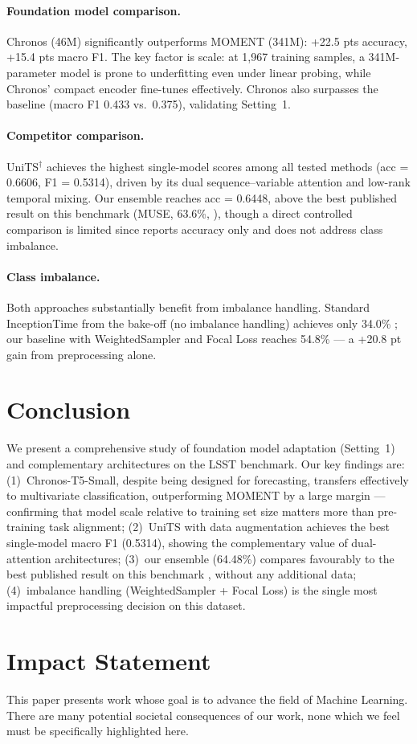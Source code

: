 \documentclass{article}
\begin{document}
\paragraph{Foundation model comparison.}
Chronos (46M) significantly outperforms MOMENT (341M): +22.5 pts accuracy,
+15.4 pts macro F1. The key factor is scale: at 1,967 training samples, a
341M-parameter model is prone to underfitting even under linear probing, while
Chronos' compact encoder fine-tunes effectively. Chronos also surpasses the
baseline (macro F1 0.433 vs.\ 0.375), validating Setting~1.

\paragraph{Competitor comparison.}
UniTS$^\dagger$ achieves the highest single-model scores among all tested methods
(acc = 0.6606, F1 = 0.5314), driven by its dual sequence--variable attention
and low-rank temporal mixing. Our ensemble reaches acc = 0.6448, above the
best published result on this benchmark (MUSE, 63.6\%, \citealt{bakeoff}),
though a direct controlled comparison is limited since \citet{bakeoff} reports
accuracy only and does not address class imbalance.

\paragraph{Class imbalance.}
Both approaches substantially benefit from imbalance handling. Standard
InceptionTime from the bake-off (no imbalance handling) achieves only 34.0\%
\citep{bakeoff}; our baseline with WeightedSampler and Focal Loss reaches
54.8\% — a +20.8 pt gain from preprocessing alone.

\section{Conclusion}

We present a comprehensive study of foundation model adaptation (Setting~1) and
complementary architectures on the LSST benchmark. Our key findings are:
(1)~Chronos-T5-Small, despite being designed for forecasting, transfers
effectively to multivariate classification, outperforming MOMENT by a large
margin — confirming that model scale relative to training set size matters more
than pre-training task alignment;
(2)~UniTS with data augmentation achieves the best single-model macro F1
(0.5314), showing the complementary value of dual-attention architectures;
(3)~our ensemble (64.48\%) compares favourably to the best published result
on this benchmark \citep{bakeoff}, without any additional data;
(4)~imbalance handling (WeightedSampler + Focal Loss) is the single most
impactful preprocessing decision on this dataset.

\section*{Impact Statement}
This paper presents work whose goal is to advance the field of Machine Learning.
There are many potential societal consequences of our work, none which we feel
must be specifically highlighted here.



\end{document}
